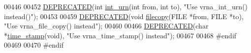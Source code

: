 \begin{DoxyCode}
00446 
00452 \mbox{\hyperlink{utils_8h_aab347a3c03fbe8e7319551b9fa0cce4a}{DEPRECATED}}(\textcolor{keywordtype}{int} \mbox{\hyperlink{utils_8h_a68ff0849d44f62fe491800378a5ffcb4}{int\_urn}}(\textcolor{keywordtype}{int} from, \textcolor{keywordtype}{int} to), \textcolor{stringliteral}{"Use vrna\_int\_urn() instead()"});
00453 
00459 \mbox{\hyperlink{utils_8h_aab347a3c03fbe8e7319551b9fa0cce4a}{DEPRECATED}}(\textcolor{keywordtype}{void} \mbox{\hyperlink{utils_8h_ab213334ce977b6d21611cdea6b80c3bf}{filecopy}}(FILE *from, FILE *to), \textcolor{stringliteral}{"Use vrna\_file\_copy() instead"});
00460 
00466 \mbox{\hyperlink{utils_8h_aab347a3c03fbe8e7319551b9fa0cce4a}{DEPRECATED}}(\textcolor{keywordtype}{char} *\mbox{\hyperlink{utils_8h_a7afeb906cb36e9d77379eabc6907ac46}{time\_stamp}}(\textcolor{keywordtype}{void}), \textcolor{stringliteral}{"Use vrna\_time\_stamp() instead"});
00467 
00468 \textcolor{preprocessor}{#endif}
00469 
00470 \textcolor{preprocessor}{#endif}
\end{DoxyCode}
